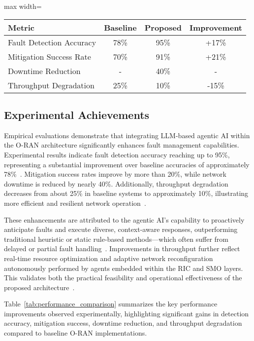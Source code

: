 \documentclass[sigconf]{acmart}
\begin{document}
\begin{table*}[htbp]
\centering
\caption{Performance Comparison of LLM-driven Agentic AI in O-RAN Fault Management~\cite{ref55}}
\label{tab:performance_comparison}
\begin{adjustbox}{max width=\textwidth}
\begin{tabular}{@{}lccc@{}}
\toprule
Metric & Baseline & Proposed & Improvement \\ \midrule
Fault Detection Accuracy & 78\% & 95\% & +17\% \\
Mitigation Success Rate & 70\% & 91\% & +21\% \\
Downtime Reduction & - & 40\% & - \\
Throughput Degradation & 25\% & 10\% & -15\% \\
\bottomrule
\end{tabular}
\end{adjustbox}
\end{table*}

\subsection{Experimental Achievements}

Empirical evaluations demonstrate that integrating LLM-based agentic AI within the O-RAN architecture significantly enhances fault management capabilities. Experimental results indicate fault detection accuracy reaching up to 95\%, representing a substantial improvement over baseline accuracies of approximately 78\%~\cite{ref46,ref55,ref27}. Mitigation success rates improve by more than 20\%, while network downtime is reduced by nearly 40\%. Additionally, throughput degradation decreases from about 25\% in baseline systems to approximately 10\%, illustrating more efficient and resilient network operation~\cite{ref55}. 

These enhancements are attributed to the agentic AI’s capability to proactively anticipate faults and execute diverse, context-aware responses, outperforming traditional heuristic or static rule-based methods—which often suffer from delayed or partial fault handling~\cite{ref27}. Improvements in throughput further reflect real-time resource optimization and adaptive network reconfiguration autonomously performed by agents embedded within the RIC and SMO layers. This validates both the practical feasibility and operational effectiveness of the proposed architecture~\cite{ref55}.

Table~\ref{tab:performance_comparison} summarizes the key performance improvements observed experimentally, highlighting significant gains in detection accuracy, mitigation success, downtime reduction, and throughput degradation compared to baseline O-RAN implementations.
\end{document}
